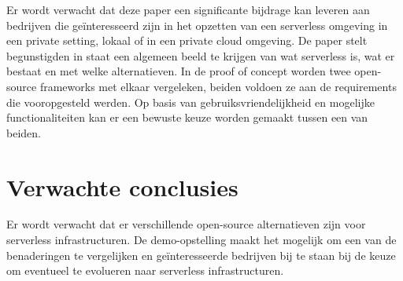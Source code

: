 Er wordt verwacht dat deze paper een significante bijdrage kan leveren aan bedrijven die geïnteresseerd zijn in het opzetten van een serverless omgeving in een private setting, lokaal of in een private cloud omgeving. De paper stelt begunstigden in staat een algemeen beeld te krijgen van wat serverless is, wat er bestaat en met welke alternatieven. In de proof of concept worden twee open-source frameworks met elkaar vergeleken, beiden voldoen ze aan de requirements die vooropgesteld werden. Op basis van gebruiksvriendelijkheid en mogelijke functionaliteiten kan er een bewuste keuze worden gemaakt tussen een van beiden.


\section{Verwachte conclusies}
\label{sec:verwachte_conclusies}

Er wordt verwacht dat er verschillende open-source alternatieven zijn voor serverless infrastructuren. De demo-opstelling maakt het mogelijk om een van de benaderingen te vergelijken en geïnteresseerde bedrijven bij te staan bij de keuze om eventueel te evolueren naar serverless infrastructuren.
